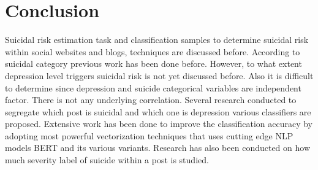 \documentclass[sn-mathphys,Numbered]{sn-jnl}%
\theoremstyle{thmstyleone}%
\theoremstyle{thmstyletwo}%
\theoremstyle{thmstylethree}%
\begin{document}
\section{Conclusion}
Suicidal risk estimation task and classification samples to determine suicidal risk within social websites and blogs, techniques are discussed before. According to suicidal category previous work has been done before. However, to what extent depression level triggers suicidal risk is not yet discussed before. Also it is difficult to determine since depression and suicide categorical variables are independent factor. There is not any underlying correlation. Several research conducted to segregate which post is suicidal and which one is depression various classifiers are proposed. Extensive work has been done to improve the classification accuracy by adopting most powerful vectorization techniques that uses cutting edge NLP models BERT and its various variants. Research has also been conducted on how much severity label of suicide within a post is studied. 
\end{document}
